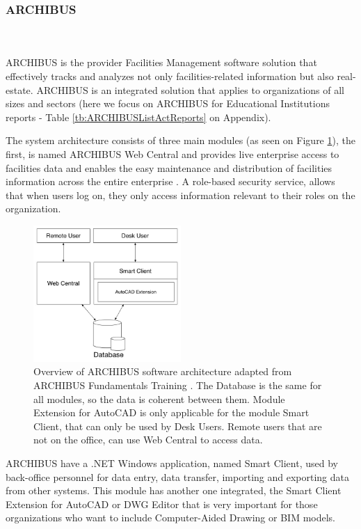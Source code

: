 \subsubsection{ARCHIBUS}

\hfill \\ \\ ARCHIBUS is the provider Facilities Management software solution that effectively tracks and analyzes not only facilities-related information but also real-estate. ARCHIBUS is an integrated solution that applies to organizations of all sizes and sectors (here we focus on ARCHIBUS for Educational Institutions reports - Table \ref{tb:ARCHIBUSListActReports} on Appendix).

The system architecture consists of three main modules (as seen on Figure \ref{fig:ArchiModules}), the first, is named ARCHIBUS Web Central and provides live enterprise access to facilities data and enables the easy maintenance and distribution of facilities information across the entire enterprise \cite{ARCHI}. A role-based security service, allows that when users log on, they only access information relevant to their roles on the organization.

\begin{figure}[t!]
  \centering
  \includegraphics[width=0.50\textwidth]{img/ARCHIBUSModules.jpg}
  \caption{Overview of ARCHIBUS software architecture adapted from ARCHIBUS Fundamentals Training \cite{ARCHI}. The Database is the same for all modules, so the data is coherent between them. Module Extension for AutoCAD is only applicable for the module Smart Client, that can only be used by Desk Users. Remote users that are not on the office, can use Web Central to access data.}
  \label{fig:ArchiModules}
\end{figure}
 
ARCHIBUS have a .NET Windows application, named Smart Client, used by back-office personnel for data entry, data transfer, importing and exporting data from other systems. This module has another one integrated, the Smart Client Extension for AutoCAD or DWG Editor that is very important for those organizations who want to include Computer-Aided Drawing or BIM models.  


